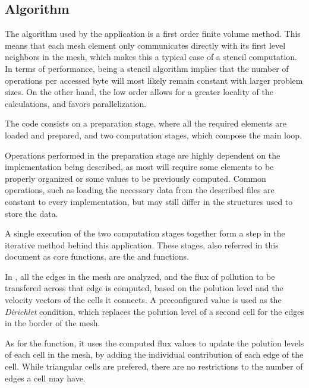 \subsection{Algorithm}

The algorithm used by the \polu application is a first order finite volume method. This means that each mesh element only communicates directly with its first level neighbors in the mesh, which makes this a typical case of a stencil computation. In terms of performance, being a stencil algorithm implies that the number of operations per accessed byte will most likely remain constant with larger problem sizes. On the other hand, the low order allows for a greater locality of the calculations, and favors parallelization.

The code consists on a preparation stage, where all the required elements are loaded and prepared, and two computation stages, which compose the main loop.

Operations performed in the preparation stage are highly dependent on the implementation being described, as most will require some elements to be properly organized or some values to be previously computed. Common operations, such as loading the necessary data from the described files are constant to every implementation, but may still differ in the structures used to store the data.

A single execution of the two computation stages together form a step in the iterative method behind this application. These stages, also referred in this document as core functions, are the \computeflux and \update functions.

In \computeflux, all the edges in the mesh are analyzed, and the flux of pollution to be transfered across that edge is computed, based on the polution level and the velocity vectors of the cells it connects. A preconfigured value is used as the \textit{Dirichlet} condition, which replaces the polution level of a second cell for the edges in the border of the mesh.

As for the \update function, it uses the computed flux values to update the polution levels of each cell in the mesh, by adding the individual contribution of each edge of the cell. While triangular cells are prefered, there are no restrictions to the number of edges a cell may have.

